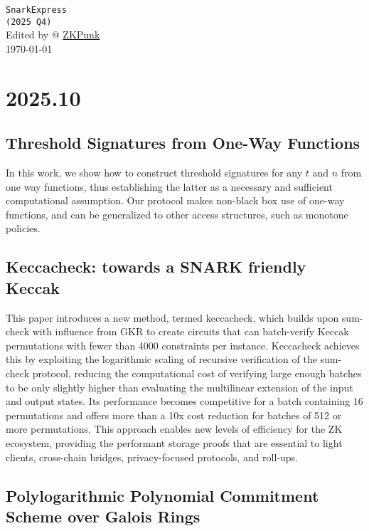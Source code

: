 \documentclass[11pt,oneside]{book}
\theoremstyle{definition}
\theoremstyle{remark}
\theoremstyle{plain}
\begin{document}
\thispagestyle{empty}
\begin{center}
\vfill
{\Huge \texttt{SnarkExpress} }\\[0.8em]
{\LARGE\texttt{(2025 Q4)}}\\[2em]
{Edited by  @ \href{https://zkpunk.pro}{ZKPunk}}\\[1em]
{\large\today}
\vfill
\end{center}
\newpage

\tableofcontents
\newpage

\chapter{2025.10}
\section{\cite{cryptoeprint:2025/1762} Threshold Signatures from One-Way Functions}
In this work, we show how to construct threshold signatures for any $t$ and $n$ from one way functions, thus establishing the latter as a necessary and sufficient computational assumption. Our protocol makes non-black box use of one-way functions, and can be generalized to other access structures, such as monotone policies.

\section{\cite{cryptoeprint:2025/1764} Keccacheck: towards a SNARK friendly Keccak}
This paper introduces a new method, termed keccacheck, which builds upon sum-check with influence from GKR to create circuits that can batch-verify Keccak permutations with fewer than 4000 constraints per instance. Keccacheck achieves this by exploiting the logarithmic scaling of recursive verification of the sum-check protocol, reducing the computational cost of verifying large enough batches to be only slightly higher than evaluating the multilinear extension of the input and output states. Its performance becomes competitive for a batch containing 16 permutations and offers more than a 10x cost reduction for batches of 512 or more permutations. This approach enables new levels of efficiency for the ZK ecosystem, providing the performant storage proofs that are essential to light clients, cross-chain bridges, privacy-focused protocols, and roll-ups.
\section{\cite{cryptoeprint:2025/1767} Polylogarithmic Polynomial Commitment Scheme over Galois Rings
}
\end{document}
